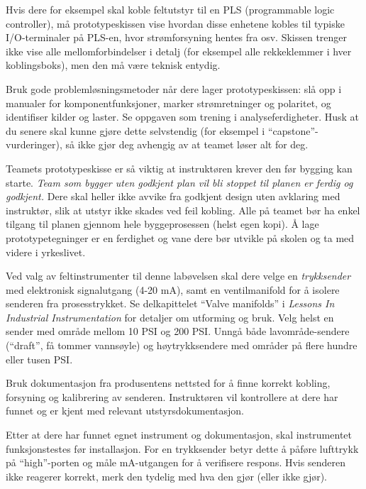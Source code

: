 Hvis dere for eksempel skal koble feltutstyr til en PLS (programmable logic controller), må prototypeskissen vise hvordan disse enhetene kobles til typiske I/O-terminaler på PLS-en, hvor strømforsyning hentes fra osv. Skissen trenger ikke vise alle mellomforbindelser i detalj (for eksempel alle rekkeklemmer i hver koblingsboks), men den må være teknisk entydig.

Bruk gode problemløsningsmetoder når dere lager prototypeskissen: slå opp i manualer for komponentfunksjoner, marker strømretninger og polaritet, og identifiser kilder og laster. Se oppgaven som trening i analyseferdigheter. Husk at du senere skal kunne gjøre dette selvstendig (for eksempel i ``capstone''-vurderinger), så ikke gjør deg avhengig av at teamet løser alt for deg.

Teamets prototypeskisse er så viktig at instruktøren krever den før bygging kan starte. {\it Team som bygger uten godkjent plan vil bli stoppet til planen er ferdig og godkjent.} Dere skal heller ikke avvike fra godkjent design uten avklaring med instruktør, slik at utstyr ikke skades ved feil kobling. Alle på teamet bør ha enkel tilgang til planen gjennom hele byggeprosessen (helst egen kopi). Å lage prototypetegninger er en ferdighet og vane dere bør utvikle på skolen og ta med videre i yrkeslivet.

\vskip 10pt

Ved valg av feltinstrumenter til denne labøvelsen skal dere velge en {\it trykksender} med elektronisk signalutgang (4-20 mA), samt en ventilmanifold for å isolere senderen fra prosesstrykket. Se delkapittelet ``Valve manifolds'' i {\it Lessons In Industrial Instrumentation} for detaljer om utforming og bruk. Velg helst en sender med område mellom 10 PSI og 200 PSI. Unngå både lavområde-sendere (``draft'', få tommer vannsøyle) og høytrykksendere med områder på flere hundre eller tusen PSI.

Bruk dokumentasjon fra produsentens nettsted for å finne korrekt kobling, forsyning og kalibrering av senderen. Instruktøren vil kontrollere at dere har funnet og er kjent med relevant utstyrsdokumentasjon.

Etter at dere har funnet egnet instrument og dokumentasjon, skal instrumentet funksjonstestes før installasjon. For en trykksender betyr dette å påføre lufttrykk på ``high''-porten og måle mA-utgangen for å verifisere respons. Hvis senderen ikke reagerer korrekt, merk den tydelig med hva den gjør (eller ikke gjør).

\vskip 10pt

